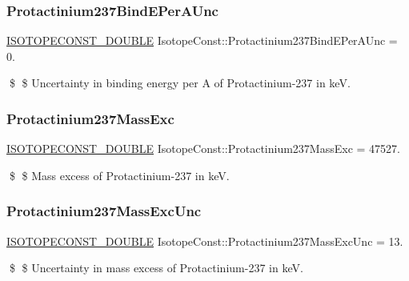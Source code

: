 \subsubsection{\texorpdfstring{Protactinium237\+Bind\+E\+Per\+A\+Unc}{Protactinium237BindEPerAUnc}}
{\footnotesize\ttfamily \mbox{\hyperlink{group___isotope_const-_macros_ga8f45a7272ce02c0b4c65c44636ed719a}{I\+S\+O\+T\+O\+P\+E\+C\+O\+N\+S\+T\+\_\+\+D\+O\+U\+B\+LE}} Isotope\+Const\+::\+Protactinium237\+Bind\+E\+Per\+A\+Unc = 0.}

\$ \$ Uncertainty in binding energy per A of Protactinium-\/237 in keV. \mbox{\label{group___isotope_const-_protactinium-_pa237_ga7aae58f4ff76852b31d93c7c10ced564}} 
\subsubsection{\texorpdfstring{Protactinium237\+Mass\+Exc}{Protactinium237MassExc}}
{\footnotesize\ttfamily \mbox{\hyperlink{group___isotope_const-_macros_ga8f45a7272ce02c0b4c65c44636ed719a}{I\+S\+O\+T\+O\+P\+E\+C\+O\+N\+S\+T\+\_\+\+D\+O\+U\+B\+LE}} Isotope\+Const\+::\+Protactinium237\+Mass\+Exc = 47527.}

\$ \$ Mass excess of Protactinium-\/237 in keV. \mbox{\label{group___isotope_const-_protactinium-_pa237_ga7e9b1b200f98b2628ef9c2899924378c}} 
\subsubsection{\texorpdfstring{Protactinium237\+Mass\+Exc\+Unc}{Protactinium237MassExcUnc}}
{\footnotesize\ttfamily \mbox{\hyperlink{group___isotope_const-_macros_ga8f45a7272ce02c0b4c65c44636ed719a}{I\+S\+O\+T\+O\+P\+E\+C\+O\+N\+S\+T\+\_\+\+D\+O\+U\+B\+LE}} Isotope\+Const\+::\+Protactinium237\+Mass\+Exc\+Unc = 13.}

\$ \$ Uncertainty in mass excess of Protactinium-\/237 in keV. \mbox{\label{group___isotope_const-_protactinium-_pa237_ga3ec0cd1cfe0fb5feadd71dcb6e0b2066}} 
